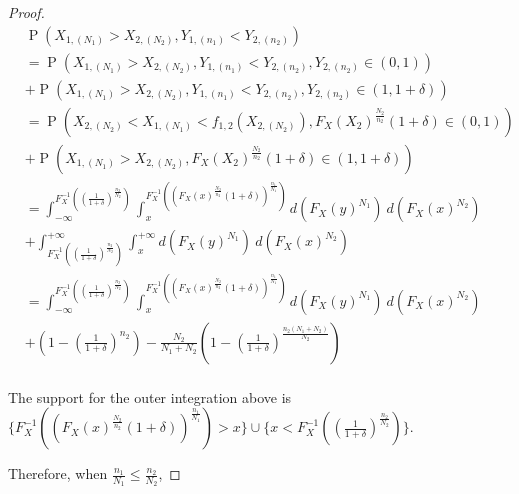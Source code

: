 \documentclass[12pt]{article}
\DeclareMathOperator*{\Prob}{P}
\begin{document}


\begin{proof}
	
\begin{align*}
  &\Prob\left(X_{1,(N_1)} > X_{2,(N_2)}, Y_{1,(n_1)} < Y_{2,(n_2)}\right) \\
  &= \Prob\left(X_{1,(N_1)} > X_{2,(N_2)}, Y_{1,(n_1)} < Y_{2,(n_2)}, Y_{2,(n_2)} \in (0,1) \right)  \\
  & + \Prob\left(X_{1,(N_1)} > X_{2,(N_2)}, Y_{1,(n_1)} < Y_{2,(n_2)}, Y_{2,(n_2)} \in (1,1 + \delta) \right) \\
  &= \Prob\left(X_{2,(N_2)} < X_{1,(N_1)} < f_{1,2}(X_{2,(N_2)}), F_X(X_2)^{\frac{N_2}{n_2}}(1+\delta) \in (0,1) \right)  \\
  & + \Prob\left(X_{1,(N_1)} > X_{2,(N_2)}, F_X(X_2)^{\frac{N_2}{n_2}}(1+\delta) \in (1,1 + \delta) \right) \\
  &= \int_{-\infty}^{F_X^{-1}((\frac{1}{1+\delta})^\frac{n_2}{N_2})}\int_{x}^{F_X^{-1}((F_X(x)^\frac{N_2}{n_2}(1+\delta))^{\frac{n_1}{N_1}})} d(F_X(y)^{N_1}) \  d(F_X(x)^{N_2}) \\
  &+ \int_{F_X^{-1}((\frac{1}{1+\delta})^\frac{n_2}{N_2})}^{+\infty}\int_{x}^{+\infty} d(F_X(y)^{N_1}) \  d(F_X(x)^{N_2}) \\
  &= \int_{-\infty}^{F_X^{-1}((\frac{1}{1+\delta})^\frac{n_2}{N_2})}\int_{x}^{F_X^{-1}((F_X(x)^\frac{N_2}{n_2}(1+\delta))^{\frac{n_1}{N_1}})} d(F_X(y)^{N_1}) \  d(F_X(x)^{N_2}) \\
  &+ (1 - (\frac	{1}{1+\delta})^{n_2}) - \frac{N_2}{N_1 + N_2}(1 - (\frac{1}{1+\delta})^{\frac{n_2(N_1+N_2)}{N_2}}) \\
  \end{align*}

The support for the outer integration above is $\{F_X^{-1}((F_X(x)^\frac{N_2}{n_2}(1+\delta))^{\frac{n_1}{N_1}}) > x\} \cup \{ x <  F_X^{-1}((\frac{1}{1+\delta})^\frac{n_2}{N_2}) \}$.

Therefore, when $\frac{n_1}{N_1} \leq \frac{n_2}{N_2}$, 


\end{proof}
\end{document}
